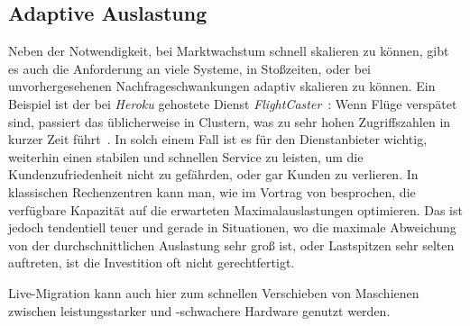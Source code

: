 \subsection{Adaptive Auslastung}
\label{sec:adaptive-auslastung}
Neben der Notwendigkeit, bei Marktwachstum schnell skalieren zu
können, gibt es auch die Anforderung an viele Systeme, in Stoßzeiten,
oder bei unvorhergesehenen Nachfrageschwankungen adaptiv skalieren zu
können. Ein Beispiel ist der bei \emph{Heroku} gehostete Dienst
\emph{FlightCaster}~\cite{flightcaster}: Wenn Flüge verspätet sind,
passiert das üblicherweise in Clustern, was zu sehr hohen
Zugriffszahlen in kurzer Zeit führt~\cite{flightcaster_success}. In
solch einem Fall ist es für den Dienstanbieter wichtig, weiterhin
einen stabilen und schnellen Service zu leisten, um die
Kundenzufriedenheit nicht zu gefährden, oder gar Kunden zu
verlieren. In klassischen Rechenzentren kann man, wie im Vortrag von
\cite{benchmarkingthecloud} besprochen, die verfügbare Kapazität auf
die erwarteten Maximalauslastungen optimieren. Das ist jedoch
tendentiell teuer und gerade in Situationen, wo die maximale
Abweichung von der durchschnittlichen Auslastung sehr groß ist, oder
Lastspitzen sehr selten auftreten, ist die Investition oft nicht
gerechtfertigt.

Live-Migration kann auch hier zum schnellen Verschieben von Maschienen
zwischen leistungsstarker und -schwachere Hardware genutzt werden.

